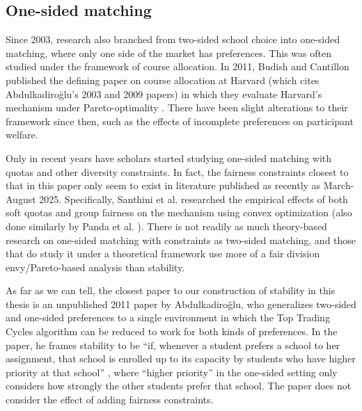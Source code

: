 \subsection{One-sided matching}

Since 2003, research also branched from two-sided school choice into one-sided
matching, where only one side of the market has preferences. This was often
studied under the framework of course allocation. In 2011, Budish and
Cantillon published the defining paper on course allocation at Harvard (which
cites Abdulkadiroğlu’s 2003 and 2009 papers) in which they evaluate Harvard’s
mechanism under Pareto-optimality \cite{budish}. There
have been slight alterations to their framework since then, such as the effects
of incomplete preferences on participant welfare.

Only in recent years have scholars started studying one-sided matching with
quotas and other diversity constraints. In fact, the fairness constraints closest to that
in this paper only
seem to exist in literature published as recently as March-August 2025. Specifically,
Santhini et al. researched the empirical effects of both soft quotas
\cite{santhini} and group fairness \cite{santhini-group-fairness} on the
mechanism using convex optimization (also done similarly by Panda et al.
\cite{pandagroupfairness}). There is not readily as much theory-based research
on one-sided matching with constraints as two-sided matching, and those that do
study it under a theoretical framework use more of a fair division envy/Pareto-based analysis than
stability.

As far as we can tell, the closest paper to our construction of stability in
this thesis is an unpublished 2011 paper by Abdulkadiroğlu, who generalizes
two-sided and one-sided preferences to a single environment in which the Top
Trading Cycles algorithm can be reduced to work for both kinds of preferences.
In the paper, he frames
stability to be “if, whenever a student prefers a school to her assignment, that
school is enrolled up to its capacity by students who have higher priority at
that school” \cite{abdu2011generalized}, where “higher priority” in the
one-sided setting only considers how strongly the other students prefer that
school. The paper does not consider the effect of adding fairness constraints.

